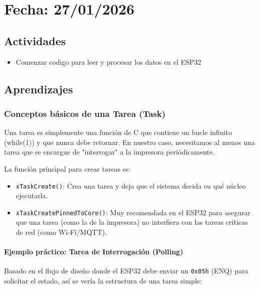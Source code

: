 \documentclass[12pt, a4paper]{article}
\begin{document}
    \section*{Fecha: 27/01/2026}

    \subsection*{Actividades}

    \begin{itemize}
        \item Comenzar codigo para leer y procesar los datos en el ESP32
    \end{itemize}

    \subsection*{Aprendizajes}

    {\color{red} \subsubsection*{Conceptos básicos de una Tarea (Task)}}
    
    Una tarea es simplemente una función de C que contiene un bucle infinito (while(1)) y que nunca debe retornar. En nuestro caso, necesitamos al menos una tarea que se encargue de "interrogar" a la impresora periódicamente.
    
    La función principal para crear tareas es:

    \begin{itemize}
        \item \texttt{xTaskCreate()}: Crea una tarea y deja que el sistema decida en qué núcleo ejecutarla.
        \item \texttt{xTaskCreatePinnedToCore()}: Muy recomendada en el ESP32 para asegurar que una tarea (como la de la impresora) no interfiera con las tareas críticas de red (como Wi-Fi/MQTT).
    \end{itemize}
    
    \paragraph{Ejemplo práctico: Tarea de Interrogación (Polling)}
    
    Basado en el flujo de diseño donde el ESP32 debe enviar un \texttt{0x05h} (ENQ) para solicitar el estado, así se vería la estructura de una tarea simple:
\end{document}
